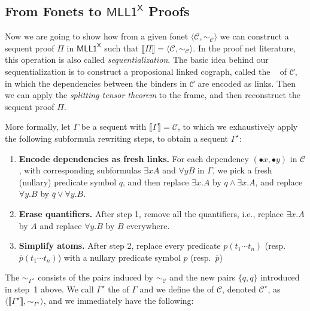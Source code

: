 \documentclass[conference,twosided,10pt]{IEEEtran}
\newtheorem{thm}{Theorem}%
\theoremstyle{definition}
\newcommand{\dual}[1]{\overline{#1}}
\newcommand{\graph}[1]{\mathcal{#1}}
\newcommand{\gC}{\graph{C}}
\newcommand{\Deri}{\Phi}
\newcommand*{\FOMLL}{\mathsf{MLL1^X}}
\newcommand*{\FOMLS}{\mathsf{MLS1^X}}
\newcommand{\cor}{\vee}
\newcommand{\cand}{\wedge}
\newcommand{\tuple}[1]{\langle#1\rangle}
\newcommand{\pair}[1]{(#1)}
\newcommand{\set}[1]{\{#1\}}
\newcommand{\single}[1]{\bullet#1}
\newcommand{\rectif}[1]{\widehat{#1}}
\newcommand{\fographof}[1]{\llbracket#1\rrbracket}
\newcommand{\graphof}[1]{\llbracket#1\rrbracket}
\newcommand{\frameof}[1]{#1^\star}
\newcommand{\substof}[1]{\sigma_{\!#1}}
\newcommand{\linkingof}[1]{\sim_{#1}}
\begin{document}


\subsection{From Fonets to $\FOMLL$ Proofs}

Now we are going to show how from a given fonet
$\tuple{\gC,\linkingof\gC}$ we can construct a sequent proof $\Pi$ in
$\FOMLL$ such that $\fographof\Pi=\tuple{\gC,\linkingof\gC}$. In the
proof net literature, this operation is also called
\emph{sequentialization}. The basic idea behind our sequentialization
is to construct a proposional linked cograph, called the ~\cite{hughes:unifn}
of $\gC$, in which the dependencies between the binders in $\gC$ are
encoded as links. Then we can apply the \emph{splitting tensor
theorem} to the frame, and then reconstruct the sequent proof $\Pi$.

More formally, let $\Gamma$ be a sequent with $\graphof\Gamma=\gC$, to which we
exhaustively apply the following
subformula rewriting steps, to obtain a sequent $\frameof\Gamma$:
\begin{enumerate}
\item {\bf Encode dependencies as fresh links.} For each dependency
  $\pair{\single x,\single y}$ in $\gC$, with corresponding
  subformulas $\exists x A$ and $\forall y B$ in $\Gamma$, we pick a
  fresh (nullary) predicate symbol $q$, and then replace $\exists
  x. A$ by $q \cand \exists x. A$, and replace $\forall y. B$ by
  $\dual q \cor \forall y. B$.
\item {\bf Erase quantifiers.} After step 1, remove all the
  quantifiers, i.e., replace $\exists x.A$ by $A$ and replace $\forall
  y.B$ by $B$ everywhere.
\item {\bf Simplify atoms.} After step 2, replace every predicate
  $p(t_1 \cdots t_n)$ (resp. $\dual p(t_1 \cdots t_n)$) with a nullary
  predicate symbol $p$ (resp.~$\dual p$)
\end{enumerate}
The $\linkingof{\frameof\Gamma}$ consists of the pairs induced by
$\linkingof\gC$ and the new pairs $\set{q,\dual q}$ introduced in
step~1 above. We call $\frameof\Gamma$ the  of $\Gamma$ and we define the  of $\gC$, denoted
$\frameof\gC$, as
$\tuple{\graphof{\frameof\Gamma},\linkingof{\frameof\Gamma}}$, and we immediately have the following:
\end{document}

